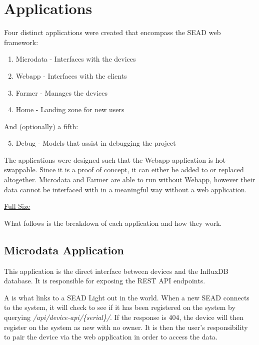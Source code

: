 \documentclass[letterpaper,10pt,english]{sphinxmanual}
\begin{document}
\chapter{Applications}
\label{applications:applications}\label{applications::doc}\label{applications:id1}
Four distinct applications were created that encompass the SEAD web framework:
\begin{enumerate}
\item {} 
Microdata - Interfaces with the devices

\item {} 
Webapp - Interfaces with the clients

\item {} 
Farmer - Manages the devices

\item {} 
Home - Landing zone for new users

\end{enumerate}

And (optionally) a fifth:
\begin{enumerate}
\setcounter{enumi}{4}
\item {} 
Debug - Models that assist in debugging the project

\end{enumerate}

The applications were designed such that the Webapp application is hot-swappable. Since it is a proof of concept, it can either be added to or replaced altogether. Microdata and Farmer are able to run without Webapp, however their data cannot be interfaced with in a meaningful way without a web application.

\href{http://i.imgur.com/uw3BtWt.png}{Full Size}

What follows is the breakdown of each application and how they work.


\section{Microdata Application}
\label{modules/microdata:microdata-application}\label{modules/microdata::doc}
This application is the direct interface between devices and the InfluxDB database. It is responsible for exposing the REST API endpoints.

A {\hyperref[modules/microdata:microdata.models.Device]{\emph{}}} is what links to a SEAD Light out in the world. When a new SEAD connects to the system, it will check to see
if it has been registered on the system by querying \emph{/api/device-api/\{serial\}/}. If the response is 404, the device will then register
on the system as new with no owner. It is then the user's responsibility to pair the device via the web application in order to access
the data.
\end{document}
